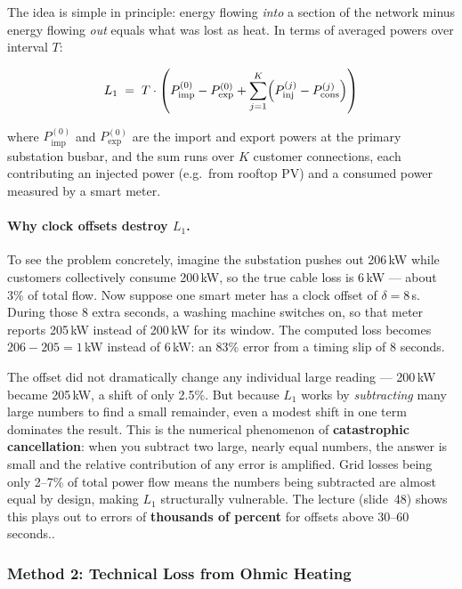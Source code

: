 The idea is simple in principle: energy flowing \emph{into} a
section of the network minus energy flowing \emph{out} equals
what was lost as heat. In terms of averaged powers over interval
$T$:

\begin{equation}
  L_1
  \;=\;
  T \cdot
  \left(
    P^{(0)}_{\mathrm{imp}} - P^{(0)}_{\mathrm{exp}}
    +
    \sum_{j=1}^{K}
    \Bigl(P^{(j)}_{\mathrm{inj}} - P^{(j)}_{\mathrm{cons}}\Bigr)
  \right)
  \label{eq:L1}
\end{equation}

where $P^{(0)}_{\mathrm{imp}}$ and $P^{(0)}_{\mathrm{exp}}$ are
the import and export powers at the primary substation busbar,
and the sum runs over $K$ customer connections, each contributing
an injected power (e.g.\ from rooftop PV) and a consumed power
measured by a smart meter.

\paragraph{Why clock offsets destroy $L_1$.}
To see the problem concretely, imagine the substation pushes out
206\,kW while customers collectively consume 200\,kW, so the
true cable loss is 6\,kW --- about 3\% of total flow. Now
suppose one smart meter has a clock offset of $\delta = 8$\,s.
During those 8 extra seconds, a washing machine switches on, so
that meter reports 205\,kW instead of 200\,kW for its window.
The computed loss becomes $206 - 205 = 1$\,kW instead of
6\,kW: an 83\% error from a timing slip of 8 seconds.

The offset did not dramatically change any individual large
reading --- 200\,kW became 205\,kW, a shift of only 2.5\%. But
because $L_1$ works by \emph{subtracting} many large numbers to
find a small remainder, even a modest shift in one term
dominates the result. This is the numerical phenomenon of
\textbf{catastrophic cancellation}: when you subtract two large,
nearly equal numbers, the answer is small and the relative
contribution of any error is amplified. Grid losses being only
2--7\% of total power flow means the numbers being subtracted
are almost equal by design, making $L_1$ structurally
vulnerable. The lecture (slide~48) shows this plays out to
errors of \textbf{thousands of percent} for offsets above
30--60 seconds..

\subsubsection{Method 2: Technical Loss from Ohmic Heating}

